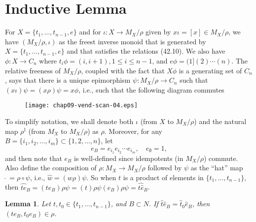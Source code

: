 \documentclass{surv-l}
\numberwithin{equation}{section}
\numberwithin{table}{section}
\numberwithin{figure}{section}
\theoremstyle{plain}
\newtheorem{lemma}[equation]{Lemma}
\theoremstyle{definition}
\begin{document}
\section{Inductive Lemma}\label{sec9.44}

For $X =\{t_{1},\ldots, t_{n-1}, e\}$ and for $\iota :
X\rightarrow M_{X}/\rho$ given by $ x\iota =[x]\in  M_{X}/\rho$,
we have $(M_{X}/\rho, \iota)$ as the freest inverse monoid that is
generated by $X=\{t_{1},\ldots, t_{n-1}, e\}$ and that satisfies
the relations (42.10). We also have $\phi : X\rightarrow C_{n}$
where $t_{i}\phi=(i, i+1), 1\leq i\leq n-1$, and
$e\phi=(1](2)\cdots(n)$. The relative freeness of $M_{X}/\rho$,
coupled with the fact that $X\phi$ is a generating set of
$C_{n}$, says that there is a unique epimorphism $\psi :
M_{X}/\rho\rightarrow C_{n}$ such that
$(x\iota)\psi=(x\rho)\psi=x\phi$, i.e., such that the following
diagram commutes
\begin{figure}[!h]
\texttt{[image: chap09-vend-scan-04.eps]}
\end{figure}

\noindent To simplify notation, we shall denote both $\iota$ (from $X$ to
$M_{X}/\rho$) and the natural map $\rho^{\natural}$ (from
$M_{X}$ to $M_{X}/\rho$) as $\rho$. Moreover, for any $B=\{i_{1},
i_{2},\ldots, i_{m}\} \subset\{1,2,\ldots, n\}$, let
\[
e_{B}=e_{i_{1}}e_{i_{2}}\cdots e_{i_{m}},\quad e_{\emptyset}=1,
\]
and then note that $e_{B}$ is well-defined since idempotents (in
$M_{X}/\rho$) commute. Also define the composition of $\rho :
M_{X}\rightarrow M_{X}/\rho$ followed by $\psi$ as the ``hat'' map
$\ \widehat{}\,=\rho \circ\psi$, i.e., $\widehat{w}=(w\rho)\psi$. So
when $t$ is a product of elements in $\{t_{1},\ldots, t_{n-1}\}$,
then $\widehat{te}_{B}=(te_{B})\rho\psi=(t)\rho\psi(e_{B})\rho\psi=\widehat{t\widehat{e}}_{B}$.

\begin{lemma}\label{lem9.44.1}
Let $t, t_{0}\in\{t_{1},\ldots, t_{n-1}\}$, and $B\subset N$. If
$\widehat{t}\widehat{e}_{B}=\widehat{t}_{0}\widehat{e}_{B}$, then
$(te_{B}, t_{0}e_{B})\in\rho$.
\end{lemma}
\end{document}
